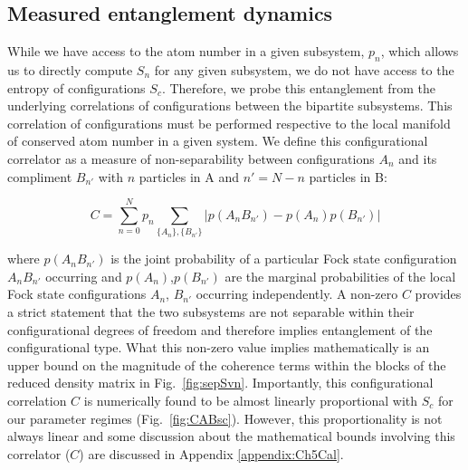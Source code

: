 
\subsection{Measured entanglement dynamics}

While we have access to the atom number in a given subsystem, $p_n$, which allows us to directly compute $S_n$ for any given subsystem, we do not have access to the entropy of configurations $S_c$. Therefore, we probe this entanglement from the underlying correlations of configurations between the bipartite subsystems. This correlation of configurations must be performed respective to the local manifold of conserved atom number in a given system. We define this configurational correlator as a measure of non-separability between configurations $A_n$ and its compliment $B_{n'}$ with $n$ particles in A and $n'=N-n$ particles in B:

\begin{equation}
\label{eqn:cab}
C=\sum_{n=0}^N p_n \sum_{\{A_n\},\{B_{n'}\}} \left | p \left ( A_n B_{n'} \right ) - p \left ( A_n \right ) p \left (B_{n'} \right ) \right |
\end{equation}

where $p \left ( A_n B_{n'} \right ) $ is the joint probability of a particular Fock state configuration $A_n B_{n'}$ occurring and $p \left ( A_n \right )$,$p \left (B_{n'} \right )$ are the marginal probabilities of the local Fock state configurations $A_n$, $B_{n'}$ occurring independently. A non-zero $C$ provides a strict statement that the two subsystems are not separable within their configurational degrees of freedom and therefore implies entanglement of the configurational type. What this non-zero value implies mathematically is an upper bound on the magnitude of the coherence terms within the blocks of the reduced density matrix in Fig.~\ref{fig:sepSvn}. Importantly, this configurational correlation $C$ is numerically found to be almost linearly proportional with $S_c$ for our parameter regimes (Fig.~\ref{fig:CABsc}). However, this proportionality is not always linear and some discussion about the mathematical bounds involving this correlator ($C$) are discussed in Appendix \ref{appendix:Ch5Cal}.

